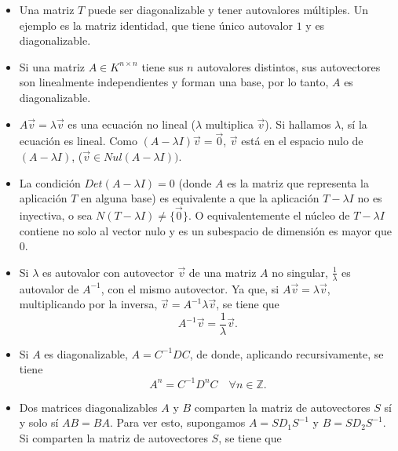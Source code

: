 \begin{remark}
\begin{itemize}
\item
Una matriz $T$ puede ser diagonalizable y tener autovalores múltiples. Un ejemplo es la matriz identidad, que tiene único autovalor $1$ y es diagonalizable.

\bigskip

\item

Si una matriz $A  \in K^{ n \times n}$ tiene  sus $n$ autovalores distintos, sus autovectores son linealmente independientes y  forman una base, por lo tanto, $A$ es diagonalizable.

\bigskip

\item $A\vec{v}=\lambda \vec{v}$  es una ecuación no lineal ($ \lambda$ multiplica $ \vec{v} $). Si hallamos $ \lambda$, sí la ecuación es lineal. Como $(A-\lambda I) \vec{v}=\vec{0}$, $ \vec{v}$ está en el espacio nulo  de $(A-\lambda I)$, ($   \vec{v} \in Nul (A-\lambda I))$. 

\bigskip

\item
 

La condición $Det(A-\lambda I)=0$ (donde $A$ es la matriz que representa la aplicación $T$ en alguna base) es equivalente a que la aplicación $T-\lambda I$ no es inyectiva, o sea  $N(T-\lambda I)\neq \{\vec{0}\}$. O equivalentemente el núcleo de  $T-\lambda I$ contiene no solo al vector nulo y es un subespacio de dimensión es mayor que $0$.

\bigskip

\item
Si $\lambda $ es autovalor con autovector $\vec{v}$  de una matriz $A$ no singular, $ \frac{1}{\lambda }$  es autovalor de $A^{-1}$, con el mismo autovector. Ya que,  si  $A\vec{v}=\lambda \vec{v}$, multiplicando por la inversa,  $  \vec{v}= A^{-1}\lambda \vec{v}$, se tiene que \[ A^{-1} \vec{v} = \frac{1}{\lambda} \vec{v}. \]


\bigskip

\item

Si $A$ es diagonalizable, $A= C^{-1}D C$, de donde, aplicando recursivamente, se tiene  $$A^n=C^{-1}D^n C  \quad \forall n \in \mathbb{Z}.$$

\bigskip

\item

Dos matrices diagonalizables $A$ y $B$ comparten la matriz de autovectores $S$ sí y solo sí  $AB= BA$.
Para ver esto, supongamos $A=  SD_1S^{-1}$ y $B= SD_2 S^{-1}$. Si comparten la matriz de autovectores $S$, se tiene que  
\bigskip


\end{itemize}
\end{remark}
